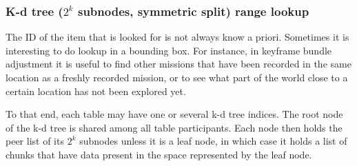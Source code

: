 \documentclass{article}
\begin{document}
\subsubsection{K-d tree ($2^k$ subnodes, symmetric split) range lookup}

The ID of the item that is looked for is not always know a priori. Sometimes
it is interesting to do lookup in a bounding box. For instance, in keyframe
bundle adjustment it is useful to find other missions that have been recorded
in the same location as a freshly recorded mission, or to see what part of the
world close to a certain location has not been explored yet.

To that end, each table may have one or several k-d tree indices.
The root node of the k-d tree is shared among all table participants. Each
node then holds the peer list of its $2^k$ subnodes unless it is a leaf node,
in which case it holds a list of chunks that have data present in the space
represented by the leaf node.
\end{document}

